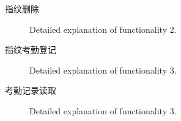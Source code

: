 \begin{description}
        \begin{table}[htbp]
             \caption{获取指纹特征命令用户层帧} \label{uart::upload-data}
        \end{table}

        \item[指纹删除] Detailed explanation of functionality 2.
        \item[指纹考勤登记] Detailed explanation of functionality 3.
        \item[考勤记录读取] Detailed explanation of functionality 3.
    \end{description}
      

